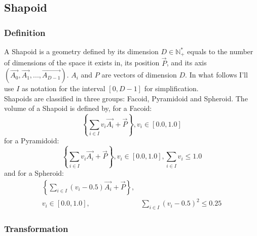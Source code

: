 \documentclass[12pt, a4paper]{article}
\begin{document}
\subsection{Shapoid}

\subsubsection{Definition}

A Shapoid is a geometry defined by its dimension $D\in\mathbb{N^*_+}$ equals to the number of dimensions of the space it exists in, its position $\overrightarrow{P}$, and its axis $(\overrightarrow{A_0},\overrightarrow{A_1},...,\overrightarrow{A_{D-1}})$. $A_i$ and $P$ are vectors of dimension $D$. In what follows I'll use $I$ as notation for the interval $[0,D-1]$ for simplification.\\

Shapoids are classified in three groups: Facoid, Pyramidoid and Spheroid. The volume of a Shapoid is defined by, for a Facoid: 
\begin{equation}
\left\lbrace \sum_{i\in I}v_i\overrightarrow{A_i}+\overrightarrow{P}\right\rbrace ,v_i\in[0.0,1.0]
\end{equation}
for a Pyramidoid:
\begin{equation}
\left\lbrace \sum_{i\in I}v_i\overrightarrow{A_i}+\overrightarrow{P}\right\rbrace ,v_i\in[0.0,1.0], \sum_{i\in I}v_i\le1.0
\end{equation}
and for a Spheroid:
\begin{equation}
\begin{array}{rl}
\left\lbrace \sum_{i\in I}(v_i-0.5)\overrightarrow{A_i}+\overrightarrow{P}\right\rbrace ,&\\
v_i\in[0.0,1.0],&\sum_{i\in I}(v_i-0.5)^2\le0.25
\end{array}
\end{equation}

\subsubsection{Transformation}
\end{document}
